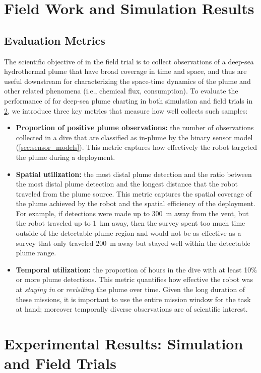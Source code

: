 \section{Field Work and Simulation Results}
\subsection{Evaluation Metrics}
\label{sec:eval_metrics}
The scientific objective of \Sentry in the field trial is to collect observations of a deep-sea hydrothermal plume that have broad coverage in time and space, and thus are useful downstream for characterizing the space-time dynamics of the plume and other related phenomena (i.e., chemical flux, consumption). To evaluate the performance of \PHORTEX for deep-sea plume charting in both simulation and field trials in \cref{sec:experiments}, we introduce three key metrics that measure how well \Sentry collects such samples:
\begin{itemize}
    \item \textbf{Proportion of positive plume observations:} the number of observations collected in a dive that are classified as in-plume by the binary sensor model (\cref{sec:sensor_models}). This metric captures how effectively the robot targeted the plume during a deployment.
    \item \textbf{Spatial utilization:} the most distal plume detection and the ratio between the most distal plume detection and the longest distance that the robot traveled from the plume source. This metric captures the spatial coverage of the plume achieved by the robot and the spatial efficiency of the deployment. For example, if detections were made up to \SI{300}{\meter} away from the vent, but the robot traveled up to \SI{1}{\km} away, then the survey spent too much time outside of the detectable plume region and would not be as effective as a survey that only traveled \SI{200}{\meter} away but stayed well within the detectable plume range. 
    \item \textbf{Temporal utilization:} the proportion of hours in the dive with at least 10\% or more plume detections. This metric quantifies how effective the robot was at \emph{staying in} or \emph{revisiting} the plume over time. Given the long duration of these missions, it is important to use the entire mission window for the task at hand; moreover temporally diverse observations are of scientific interest.
\end{itemize}

\section{Experimental Results: Simulation and Field Trials}
\label{sec:experiments}

